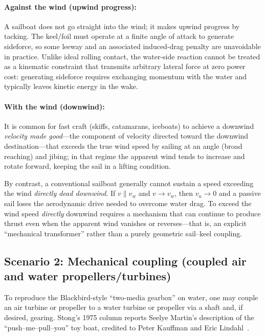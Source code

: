 \documentclass[reprint,aps,pra,longbibliography]{revtex4-2}
\begin{document}
\paragraph*{Against the wind (upwind progress):}
A sailboat does not go straight into the wind; it makes upwind progress by
tacking.  The keel/foil must operate at a finite angle of attack to generate
sideforce, so some leeway and an associated induced-drag penalty are unavoidable
in practice.  Unlike ideal rolling contact, the water-side reaction cannot be
treated as a kinematic constraint that transmits arbitrary lateral force at
zero power cost: generating sideforce requires exchanging momentum with the
water and typically leaves kinetic energy in the wake.

\paragraph*{With the wind (downwind):}
It is common for fast craft (skiffs, catamarans, iceboats) to achieve a downwind
\emph{velocity made good}---the component of velocity directed toward the downwind destination---that exceeds the true wind speed by sailing at
an angle (broad reaching) and jibing; in that regime the apparent wind tends to
increase and rotate forward, keeping the sail in a lifting condition.

By contrast, a conventional sailboat generally cannot sustain a speed exceeding
the wind \emph{directly dead downwind}.  If $v \parallel v_w$
and $v \to v_w$, then $v_a \to 0$ and a passive sail loses
the aerodynamic drive needed to overcome water drag.  To exceed the wind speed
\emph{directly} downwind requires a mechanism that can continue to produce thrust
even when the apparent wind vanishes or reverses---that is, an explicit
``mechanical transformer'' rather than a purely geometric sail--keel coupling.

\subsection{Scenario 2: Mechanical coupling (coupled air and water propellers/turbines)}

To reproduce the Blackbird-style ``two-media gearbox'' on water, one may couple an air turbine or propeller to a water turbine or propeller via a shaft and, if desired, gearing. Stong's 1975 column reports Seelye Martin's description of the ``push--me--pull--you'' toy boat, credited to Peter Kauffman and Eric Lindahl~\cite{Stong1975}.
\end{document}
